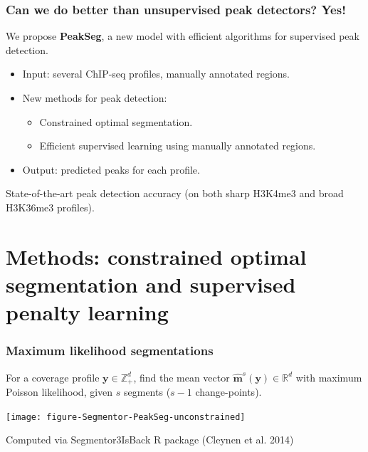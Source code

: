 \documentclass{beamer}
\newcommand{\RR}{\mathbb R}
\newcommand{\ZZ}{\mathbb Z}
\begin{document}
\begin{frame}
  \frametitle{Can we do better than unsupervised peak detectors? Yes!}
  We propose \textbf{PeakSeg}, a new model with efficient algorithms
  for supervised peak detection.
  \begin{itemize}
  \item Input: \alert<1>{several ChIP-seq profiles},
    \alert<2>{manually annotated regions}.
  \item New methods for peak detection: 
    \begin{itemize}
    \item \alert<1>{Constrained optimal segmentation}.
    \item Efficient \alert<2>{supervised learning using manually annotated
      regions}.
    \end{itemize}
  \item Output: predicted peaks for each profile.
  \end{itemize}
  State-of-the-art peak detection accuracy (on both sharp H3K4me3 and
  broad H3K36me3 profiles).
\end{frame}

\section{Methods: constrained optimal segmentation and 
  supervised penalty learning}

\begin{frame}
  \frametitle{Maximum likelihood segmentations}
  For a coverage profile $\mathbf y\in\ZZ_+^d$,
  find the mean vector $\mathbf{\hat m}^s(\mathbf y)\in\RR^d$ with
  maximum Poisson likelihood, given $s$ segments ($s-1$ change-points).

  \texttt{[image: figure-Segmentor-PeakSeg-unconstrained]}

  Computed via Segmentor3IsBack R package (Cleynen et al. 2014)

\end{frame}
\end{document}
